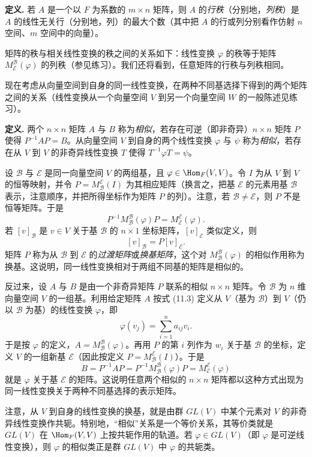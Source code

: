 \noindent\textbf{定义.} 若 $A$ 是一个以 $F$ 为系数的 $m\times n$ 矩阵，则 $A$ 的\emph{行秩}（分别地，\emph{列秩}）是 $A$ 的线性无关行（分别地，列）的最大个数（其中把 $A$ 的行或列分别看作仿射 $n$ 空间、$m$ 空间中的向量）。

矩阵的秩与相关线性变换的秩之间的关系如下：线性变换 $\varphi$ 的秩等于矩阵 $M_{\mathcal E}^{\mathcal B}(\varphi)$ 的列秩（参见练习）。我们还将看到，任意矩阵的行秩与列秩相同。

现在考虑从向量空间到自身的同一线性变换，在两种不同基选择下得到的两个矩阵之间的关系（线性变换从一个向量空间 $V$ 到另一个向量空间 $W$ 的一般陈述见练习）。

\noindent\textbf{定义.} 两个 $n\times n$ 矩阵 $A$ 与 $B$ 称为\emph{相似}，若存在可逆（即非奇异）$n\times n$ 矩阵 $P$ 使得 $P^{-1}AP=B$。从向量空间 $V$ 到自身的两个线性变换 $\varphi$ 与 $\psi$ 称为\emph{相似}，若存在从 $V$ 到 $V$ 的非奇异线性变换 $T$ 使得 $T^{-1}\varphi T=\psi$。

设 $\mathcal B$ 与 $\mathcal E$ 是同一向量空间 $V$ 的两组基，且 $\varphi\in\Hom_F(V,V)$。令 $I$ 为从 $V$ 到 $V$ 的恒等映射，并令 $P=M_{\mathcal B}^{\mathcal E}(I)$ 为其相应矩阵（换言之，把基 $\mathcal E$ 的元素用基 $\mathcal B$ 表示，注意顺序，并把所得坐标作为矩阵 $P$ 的列）。注意，若 $\mathcal B\neq\mathcal E$，则 $P$ 不是恒等矩阵。于是
\[
P^{-1}M_{\mathcal B}^{\mathcal B}(\varphi)P
=M_{\mathcal E}^{\mathcal E}(\varphi).
\]
若 $[v]_{\mathcal B}$ 是 $v\in V$ 关于基 $\mathcal B$ 的 $n\times1$ 坐标矩阵，$[v]_{\mathcal E}$ 类似定义，则
\[
[v]_{\mathcal B}=P[v]_{\mathcal E}.
\]
矩阵 $P$ 称为从 $\mathcal B$ 到 $\mathcal E$ 的\emph{过渡矩阵}或\emph{换基矩阵}，这个对 $M_{\mathcal B}^{\mathcal B}(\varphi)$ 的相似作用称为换基。这说明，同一线性变换相对于两组不同基的矩阵是相似的。

反过来，设 $A$ 与 $B$ 是由一个非奇异矩阵 $P$ 联系的相似 $n\times n$ 矩阵。令 $\mathcal B$ 为 $n$ 维向量空间 $V$ 的一组基。利用给定矩阵 $A$ 按式 (11.3) 定义从 $V$（基为 $\mathcal B$）到 $V$（仍以 $\mathcal B$ 为基）的线性变换 $\varphi$，即
\[
\varphi(v_j)=\sum_{i=1}^na_{ij}v_i.
\]
于是按 $\varphi$ 的定义，$A=M_{\mathcal B}^{\mathcal B}(\varphi)$。再用 $P$ 的第 $i$ 列作为 $w_i$ 关于基 $\mathcal B$ 的坐标，定义 $V$ 的一组新基 $\mathcal E$（因此按定义 $P=M_{\mathcal B}^{\mathcal E}(I)$）。于是
\[
B=P^{-1}AP=P^{-1}M_{\mathcal B}^{\mathcal B}(\varphi)P=M_{\mathcal E}^{\mathcal E}(\varphi)
\]
就是 $\varphi$ 关于基 $\mathcal E$ 的矩阵。这说明任意两个相似的 $n\times n$ 矩阵都以这种方式出现为同一线性变换关于两种不同基选择的表示矩阵。

注意，从 $V$ 到自身的线性变换的换基，就是由群 $GL(V)$ 中某个元素对 $V$ 的非奇异线性变换作共轭。特别地，“相似”关系是一个等价关系，其等价类就是 $GL(V)$ 在 $\Hom_F(V,V)$ 上按共轭作用的轨道。若 $\varphi\in GL(V)$（即 $\varphi$ 是可逆线性变换），则 $\varphi$ 的相似类正是群 $GL(V)$ 中 $\varphi$ 的共轭类。

